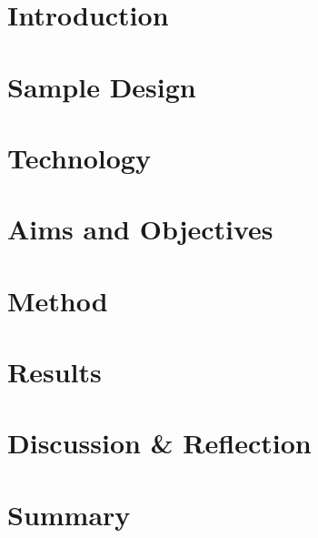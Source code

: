 \section{Introduction}
\label{sec:personal:introduction}



\section{Sample Design}
\label{sec:personal:sampledesign}



\section{Technology}
\label{sec:personal:technology}



\section{Aims and Objectives}
\label{sec:personal:aims}



\section{Method}
\label{sec:personal:method}



\section{Results}
\label{sec:personal:results}



\section{Discussion \& Reflection}
\label{sec:personal:discussion}



\section{Summary}
\label{sec:personal:summary}

